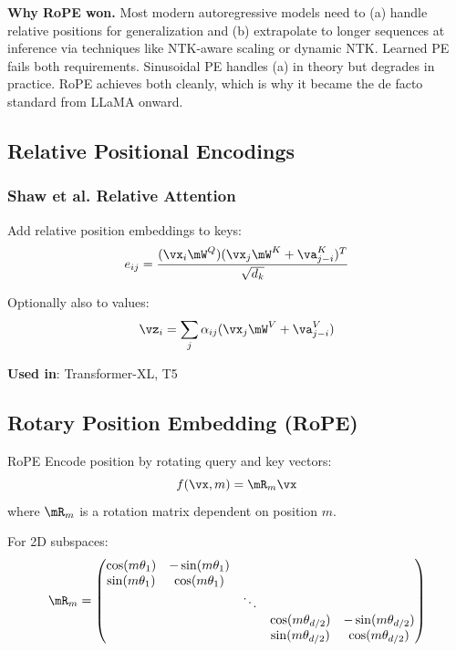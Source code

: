 \textbf{Why RoPE won.} Most modern autoregressive models need to (a) handle relative positions for generalization and (b) extrapolate to longer sequences at inference via techniques like NTK-aware scaling or dynamic NTK. Learned PE fails both requirements. Sinusoidal PE handles (a) in theory but degrades in practice. RoPE achieves both cleanly, which is why it became the de facto standard from LLaMA onward.

\subsection{Relative Positional Encodings}

\subsubsection{Shaw et al. Relative Attention}

Add relative position embeddings to keys:
\begin{equation}
e_{ij} = \frac{(\vx_i \mW^Q)(\vx_j \mW^K + \va_{j-i}^K)^T}{\sqrt{d_k}}
\end{equation}

Optionally also to values:
\begin{equation}
\vz_i = \sum_j \alpha_{ij}(\vx_j \mW^V + \va_{j-i}^V)
\end{equation}

\textbf{Used in}: Transformer-XL, T5

\subsection{Rotary Position Embedding (RoPE)}

\begin{mathresult}{RoPE}
Encode position by rotating query and key vectors:
\begin{equation}
f(\vx, m) = \mR_m \vx
\end{equation}
where $\mR_m$ is a rotation matrix dependent on position $m$.
\end{mathresult}

For 2D subspaces:
\begin{equation}
\mR_m = \begin{pmatrix}
\cos(m\theta_1) & -\sin(m\theta_1) & & \\
\sin(m\theta_1) & \cos(m\theta_1) & & \\
& & \ddots & \\
& & & \cos(m\theta_{d/2}) & -\sin(m\theta_{d/2}) \\
& & & \sin(m\theta_{d/2}) & \cos(m\theta_{d/2})
\end{pmatrix}
\end{equation}

